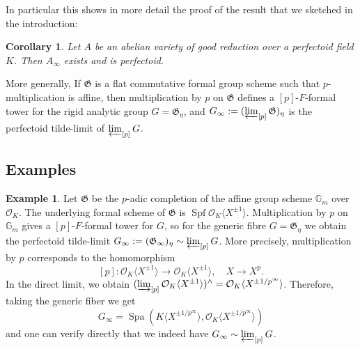 \documentclass[10pt,oneside]{amsart}
\newtheorem{corollary}[theorem]{Corollary}
\theoremstyle{definition}
\newtheorem{remark}[theorem]{Remark}
\newtheorem*{example}{Example}
\begin{document}
In particular this shows in more detail the proof of the result that we sketched in the introduction:
	\begin{corollary}\label{tilde-limit exists and is perfectoid in the good reduction case}
		Let $A$ be an abelian variety of good reduction over a perfectoid field $K$. Then $A_\infty$ exists and is perfectoid.
	\end{corollary}
	 	
More generally, If $\mathfrak G$ is a flat commutative formal group scheme such that $p$-multiplication is affine, then multiplication by $p$ on $\mathfrak G$ defines a $[p]$-$F$-formal tower for the rigid analytic group $G=\mathfrak G_\eta$, and  $G_\infty := (\varprojlim_{[p]}\mathfrak G)_\eta$ is the perfectoid tilde-limit of $\varprojlim_{[p]} G$. 

		
\subsection{Examples}				
		
	\begin{example}
		Let $\mathfrak G$ be the $p$-adic completion of the affine group scheme $\mathbb G_m$ over $\mathcal O_K$. The underlying formal scheme of $\mathfrak G$ is $\operatorname {Spf} \mathcal O_K\langle X^{\pm 1} \rangle$.  Multiplication by $p$ on $\mathbb G_m$ gives a $[p]$-$F$-formal tower for $G$, so for the generic fibre $G=\mathfrak G_\eta$ we obtain the perfectoid tilde-limit $G_\infty := (\mathfrak G_\infty)_{\eta} \sim \varprojlim_{[p]} G$. More precisely,  multiplication by $p$ corresponds to the homomorphism
		\[[p]:\mathcal O_K\langle X^{\pm 1} \rangle\rightarrow  \mathcal O_K\langle X^{\pm 1} \rangle, \quad X\rightarrow X^{p}.\]
		In the direct limit, we obtain $   (\varinjlim_{[p]} \mathcal O_K\langle X^{\pm 1} \rangle  )^{\wedge} = \mathcal O_K\langle  X^{\pm 1/p^\infty} \rangle$.  Therefore, taking the generic fiber we get
		$$G_\infty = \operatorname{Spa}(K\langle X^{\pm 1/p^\infty} \rangle,\mathcal O_K\langle X^{\pm 1/p^\infty} \rangle)$$
		and one can verify directly that we indeed have $G_\infty \sim \varprojlim_{[p]} G$.
	\end{example}
	
\end{document}
